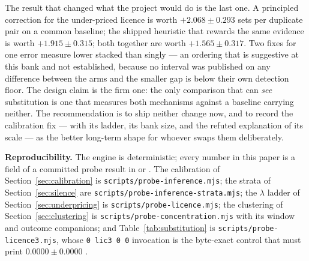 \documentclass[11pt]{article}
\newcommand{\code}[1]{\texttt{#1}}
\begin{document}
The result that changed what the project would do is the last one. A principled
correction for the under-priced licence is worth $+2.068 \pm 0.293$ sets per duplicate
pair on a common baseline; the shipped heuristic that rewards the same evidence is worth
$+1.915 \pm 0.315$; both together are worth $+1.565 \pm 0.317$. Two fixes for one error
measure lower stacked than singly --- an ordering that is suggestive at this bank and not
established, because no interval was published on any difference between the arms and the
smaller gap is below their own detection floor. The design claim is the firm one: the only
comparison that can \emph{see} substitution is one that measures both mechanisms against a
baseline carrying neither. The recommendation is to ship neither change now, and to record the
calibration fix --- with its ladder, its bank size, and the refuted explanation of its
scale --- as the better long-term shape for whoever swaps them deliberately.

\medskip
\noindent\textbf{Reproducibility.} The engine is deterministic; every number in this paper
is a field of a committed probe result in \cite{asking} or \cite{concession}. The
calibration of Section~\ref{sec:calibration} is \code{scripts/probe-inference.mjs}; the
strata of Section~\ref{sec:silence} are \code{scripts/probe-inference-strata.mjs}; the
$\lambda$ ladder of Section~\ref{sec:underpricing} is \code{scripts/probe-licence.mjs};
the clustering of Section~\ref{sec:clustering} is \code{scripts/probe-concentration.mjs}
with its window and outcome companions; and Table~\ref{tab:substitution} is
\code{scripts/probe-licence3.mjs}, whose \code{0 lic3 0 0} invocation is the byte-exact
control that must print $0.0000 \pm 0.0000$ \cite{asking,repo}.
\end{document}
